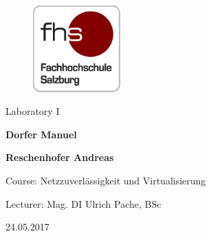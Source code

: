 
\begin{titlepage}

\hspace{7cm}

\begin{figure}[!ht]
	\centering
	\includegraphics[width=0.3\textwidth]{fhs_logo_web.png}
\end{figure}

\begin{center}
	\vspace{2cm}
	\Huge Laboratory I
	\vspace{3cm}
	
	\Large{\bf\large Dorfer Manuel}	
	
	\Large{\bf\large Reschenhofer Andreas}
	\vspace{5cm}

	\large Course: Netzzuverlässigkeit und Virtualisierung 
	
	\large Lecturer: Mag. DI Ulrich Pache, BSc 
	
	\large 24.05.2017
\end{center}

\end{titlepage}